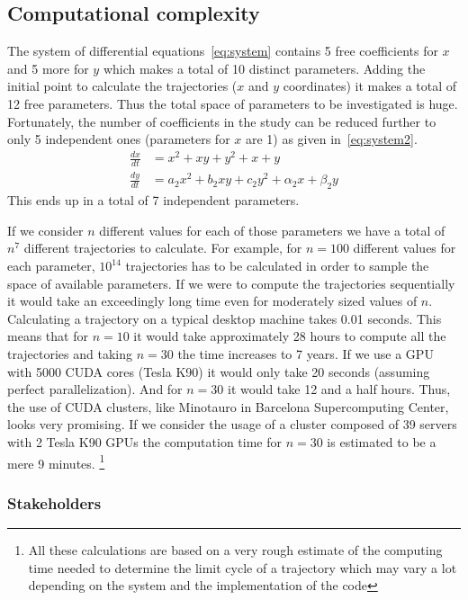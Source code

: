 \pagebreak

\subsection{Computational complexity}

The system of differential equations~\cref{eq:system} contains 5 free coefficients for $x$ and 5 more for $y$ which makes a total of 10 distinct parameters. Adding the initial point to calculate the trajectories ($x$ and $y$ coordinates) it makes a total of 12 free parameters. Thus the total space of parameters to be investigated is huge. Fortunately, the number of coefficients in the study can be reduced further to only 5 independent ones (parameters for $x$ are 1) as given in~\cref{eq:system2}. 
\begin{align}\label{eq:system2}
    \frac{dx}{dt} &= x^2 + xy + y^2 + x + y \nonumber \\
    \frac{dy}{dt} &= a_2x^2 + b_2xy + c_2y^2 + \alpha_2x + \beta_2y
\end{align}
This ends up in a total of 7 independent parameters.

If we consider $n$ different values for each of those parameters we have a total of $n^7$ different trajectories to calculate. For example, for $n=100$ different values for each parameter, $10^{14}$ trajectories has to be calculated in order to sample the space of available parameters. If we were to compute the trajectories sequentially it would take an exceedingly long time even for moderately sized values of $n$. Calculating a trajectory on a typical desktop machine takes 0.01 seconds. This means that for $n=10$ it would take approximately 28 hours to compute all the trajectories and taking $n=30$ the time increases to 7 years. If we use a GPU with 5000 CUDA cores (Tesla K90) it would only take 20 seconds (assuming perfect parallelization). And for $n=30$ it would take 12 and a half hours. Thus, the use of CUDA clusters, like Minotauro in Barcelona Supercomputing Center, looks very promising. If we consider the usage of a cluster composed of 39 servers with 2 Tesla K90 GPUs the computation time for $n=30$ is estimated to be a mere 9 minutes. \footnote{All these calculations are based on a very rough estimate of the computing time needed to determine the limit cycle of a trajectory which may vary a lot depending on the system and the implementation of the code}

\subsubsection{Stakeholders}

